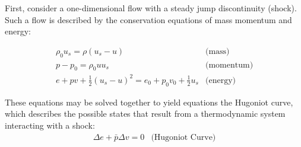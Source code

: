 \documentclass[twocolumn,10pt]{asme2ej}
\begin{document}
First, consider a one-dimensional flow with a steady jump discontinuity (shock). Such a flow is described by the conservation equations of mass momentum and energy\cite{RN818}:

\[\begin{array}{*{20}{c}}
	{{\rho _0}{u_s} = \rho \left( {{u_s} - u} \right)}&{\text{(mass)}}\\
	{p - {p_0} = {\rho _0}u{u_s}}&{\text{(momentum)}}\\
	{e + pv + \frac{1}{2}{{\left( {{u_s} - u} \right)}^2} = {e_0} + {p_0}{v_0} + \frac{1}{2}{u_s}}&{\text{(energy)}}
\end{array}\]

These equations may be solved together to yield equations the Hugoniot curve, which describes the possible states that result from a thermodynamic system interacting with a shock\cite{RN818}:
\[\begin{array}{*{20}{c}}
	{\Delta e + \bar p\Delta v = 0}&{\text{(Hugoniot Curve)}}
\end{array}\]
\end{document}
